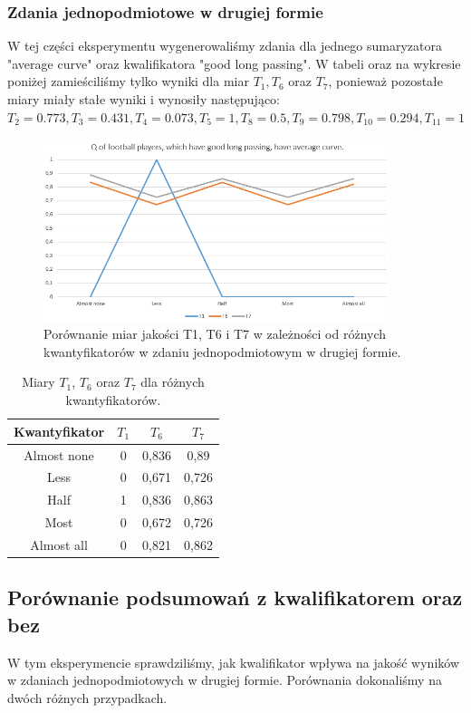 \documentclass{classrep}
\begin{document}
	\subsubsection{Zdania jednopodmiotowe w drugiej formie}	
	W tej części eksperymentu wygenerowaliśmy zdania dla jednego sumaryzatora "average curve" oraz kwalifikatora "good long passing".
	W tabeli oraz na wykresie poniżej zamieściliśmy tylko wyniki dla miar $T_1, T_6$ oraz $T_7$, ponieważ pozostałe miary miały stałe wyniki i wynosiły następująco: $T_2 = 0.773, T_3 = 0.431, T_4 = 0.073, T_5 = 1, T_8 = 0.5, T_9 = 0.798, T_{10} = 0.294, T_{11} = 1$
	
	\begin{figure}[h!]
		\centering
		\includegraphics[width=0.9\textwidth]{ex/1b.png}
		\caption{Porównanie miar jakości T1, T6 i T7 w zależności od różnych kwantyfikatorów w zdaniu jednopodmiotowym w drugiej formie.}
		\label{wyniki1b}
	\end{figure}
	
	\begin{table}[h!]
		\centering
		\begin{tabular} {c c c c}
			\hline
			\textbf{Kwantyfikator} & \textbf{$T_1$} & \textbf{$T_6$} & \textbf{$T_7$} \\ [0.5ex] 
			\hline	
			\hline 
			Almost none	& 0 &	0,836 &	0,89 \\
			Less	& 0	& 0,671	& 0,726 \\
			Half	& 1 &	0,836	& 0,863 \\
			Most	& 0 &	0,672	& 0,726 \\ 
			Almost all & 0 &	0,821	& 0,862 \\ 				
			\hline			
		\end{tabular}
		\caption{Miary $T_1$, $T_6$ oraz $T_7$ dla różnych kwantyfikatorów. }
		\label{tabelaex1b}
	\end{table}
	
	\newpage
	\subsection{Porównanie podsumowań z kwalifikatorem oraz bez}
	W tym eksperymencie sprawdziliśmy, jak kwalifikator wpływa na jakość wyników w zdaniach jednopodmiotowych w drugiej formie. Porównania dokonaliśmy na dwóch różnych przypadkach.
	
\end{document}
